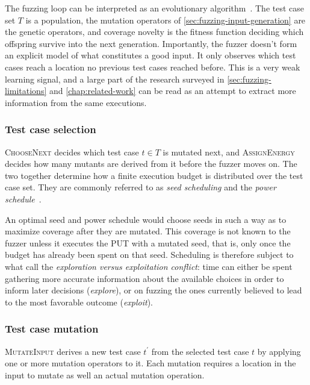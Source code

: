 The fuzzing loop can be interpreted as an evolutionary algorithm~\cite{she_neuzz_2019,manes_art_2019}.
The test case set $T$ is a population, the mutation operators of
\cref{sec:fuzzing-input-generation} are the genetic operators, and coverage novelty is the
fitness function deciding which offspring survive into the next generation.
Importantly, the fuzzer doesn't form an explicit model of what constitutes a good input.
It only observes which test cases reach a location no previous test cases reached before.
This is a very weak learning signal, and a large part of the research surveyed in
\cref{sec:fuzzing-limitations} and \cref{chap:related-work} can be read as an attempt to
extract more information from the same executions.

\subsubsection{Test case selection}

\textsc{ChooseNext} decides which test case $t \in T$ is mutated next, and
\textsc{AssignEnergy} decides how many mutants are derived from it before the fuzzer moves
on.
The two together determine how a finite execution budget is distributed over the test case
set.
They are commonly referred to as \emph{seed scheduling} and the \emph{power
schedule}~\cite{manes_art_2019,bohme_coverage-based_2016}.

An optimal seed and power schedule would choose seeds in such a way as to maximize coverage
after they are mutated.
This coverage is not known to the fuzzer unless it executes the PUT with a mutated seed,
that is, only once the budget has already been spent on that seed.
Scheduling is therefore subject to what \textcite{manes_art_2019} call the
\emph{exploration versus exploitation conflict}: time can either be spent gathering more
accurate information about the available choices in order to inform later decisions
(\emph{explore}), or on fuzzing the ones currently believed to lead to the most favorable
outcome (\emph{exploit}).

\subsubsection{Test case mutation}

\textsc{MutateInput} derives a new test case $t^\prime$ from the selected test case $t$ by
applying one or more mutation operators  to it.
Each mutation requires a location in the input to mutate as well an actual mutation operation.

